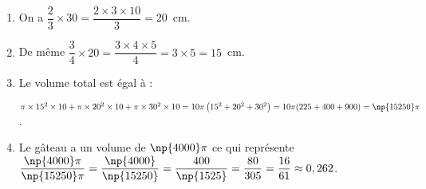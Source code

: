 
\medskip

%
% 
%
	 	 
\begin{enumerate}
\item %
On a $\dfrac{2}{3} \times 30 = \dfrac{2 \times 3 \times 10}{3} = 20$~cm. 
\item %
De même $\dfrac{3}{4} \times 20 = \dfrac{3 \times 4 \times 5}{4} = 3 \times 5 = 15$~cm.
\item %
 
Le volume total est égal à :

$\pi\times 15^2 \times 10 + \pi\times 20^2 \times 10 + \pi\times 30^2 \times 10 = 10\pi\left(15^2 + 20^2 + 30^2 \right) = 10\pi(225 + 400 + 900) = \np{15250}\pi$. 
\item %
Le gâteau  a un volume de $\np{4000}\pi$ ce qui représente $\dfrac{\np{4000}\pi}{\np{15250}\pi} = \dfrac{\np{4000}}{\np{15250}} = \dfrac{400}{\np{1525}} = \dfrac{80}{305} = \dfrac{16}{61} \approx 0,262$.
\end{enumerate}

\bigskip


